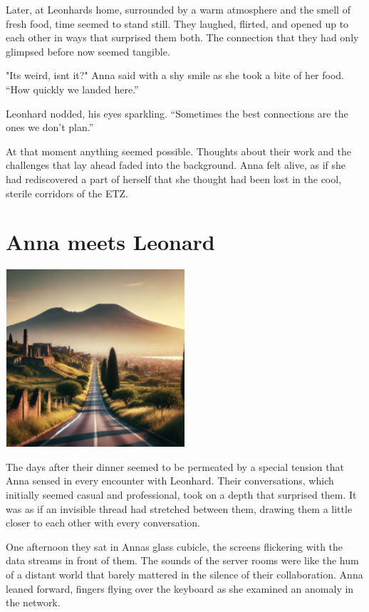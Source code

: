 \documentclass[
]{article}
\begin{document}
Later, at Leonhard\textquotesingle s home, surrounded by a warm
atmosphere and the smell of fresh food, time seemed to stand still. They
laughed, flirted, and opened up to each other in ways that surprised
them both. The connection that they had only glimpsed before now seemed
tangible.

"It\textquotesingle s weird, isn\textquotesingle t it?" Anna said with a
shy smile as she took a bite of her food. ``How quickly we landed
here.''

Leonhard nodded, his eyes sparkling. ``Sometimes the best connections
are the ones we don't plan.''

At that moment anything seemed possible. Thoughts about their work and
the challenges that lay ahead faded into the background. Anna felt
alive, as if she had rediscovered a part of herself that she thought had
been lost in the cool, sterile corridors of the ETZ.

\section{Anna meets Leonard}\label{anna-meets-leonard}

\includegraphics[width=2.625in,height=2.59375in]{media/image2.png}

The days after their dinner seemed to be permeated by a special tension
that Anna sensed in every encounter with Leonhard. Their conversations,
which initially seemed casual and professional, took on a depth that
surprised them. It was as if an invisible thread had stretched between
them, drawing them a little closer to each other with every
conversation.

One afternoon they sat in Anna\textquotesingle s glass cubicle, the
screens flickering with the data streams in front of them. The sounds of
the server rooms were like the hum of a distant world that barely
mattered in the silence of their collaboration. Anna leaned forward,
fingers flying over the keyboard as she examined an anomaly in the
network.
\end{document}
